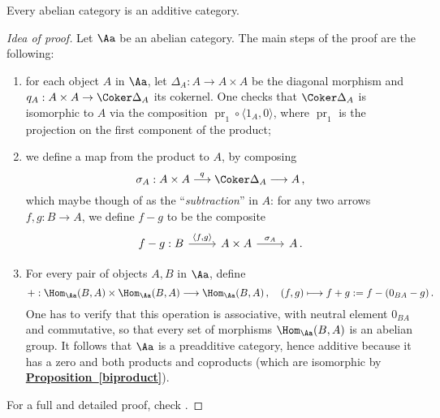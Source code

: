 \begin{thm}
    Every abelian category is an additive category.
    \begin{proof}[Idea of proof]
    Let $\Aa$ be an abelian category.
    The main steps of the proof are the following:
        \begin{enumerate}
            \item for each object $A$ in $\Aa$, 
            let $\Delta_{A}:A \to A \times A$ be the diagonal morphism
            and $q_{A} : A \times A \to \Coker \Delta_{A}$ its cokernel.
            One checks that $\Coker \Delta_{A}$ is isomorphic to $A$
            via the composition $\operatorname{pr}_{1} \circ \langle 1_{A},0 \rangle$,
            where $\operatorname{pr}_{1}$ is the projection on
            the first component of the product;
            
            \item we define a map from the product to $A$, by composing
            \begin{equation*}
                \sigma_{A} : A \times A \overset{q}{\longrightarrow} \Coker \Delta_{A} 
                \longrightarrow A\,,
            \end{equation*}
            which maybe though of as the ``\emph{subtraction}'' in $A$:
            for any two arrows $f,g : B \to A$, we define $f-g$ to be the composite
            \begin{equation*}
            \begin{tikzcd}
                f-g : B \ar[r,"{\langle f, g \rangle}"] 
                & A \times A \ar[r, "\sigma_{A}"] & A\,.
            \end{tikzcd}
            \end{equation*}
            \item For every pair of objects $A,B$ in $\Aa$, define 
            \begin{equation*}
                + : \Hom_{\Aa}(B,A) \times \Hom_{\Aa}(B,A) \longrightarrow \Hom_{\Aa}(B,A)\,,
                \quad (f,g) \longmapsto f + g := f - (0_{BA} - g)\,.
            \end{equation*}
            One has to verify that this operation is associative, 
            with neutral element $0_{BA}$ and commutative, so that
            every set of morphisms $\Hom_{\Aa}(B,A)$ is an abelian group.
            It follows that $\Aa$ is a preadditive category,
            hence additive because it has a zero and both products
            and coproducts (which are isomorphic by \hyperref[biproduct]{\textbf{Proposition~\ref*{biproduct}}}).
        \end{enumerate}
        For a full and detailed proof, check \parencite[1.6~Additivity of abelian categories]{borceux}.
    \end{proof}
\end{thm}

